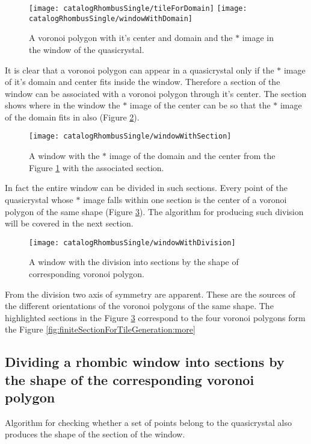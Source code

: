 \documentclass[text.tex]{subfiles}
\begin{document}
\begin{figure}[h]
\centering
\texttt{[image: catalogRhombusSingle/tileForDomain]}
\texttt{[image: catalogRhombusSingle/windowWithDomain]}
\caption{A voronoi polygon with it's center and domain and the $\ast$ image in the window of the quasicrystal.}
\label{fig:windowWithDomain}
\end{figure}

It is clear that a voronoi polygon can appear in a quasicrystal only if the $\ast$ image of it's domain and center fits inside the window. Therefore a section of the window can be associated with a voronoi polygon through it's center. The section shows where in the window the $\ast$ image of the center can be so that the $\ast$ image of the domain fits in also (Figure \ref{fig:windowWithSection}). 

\begin{figure}[h]
\centering
\texttt{[image: catalogRhombusSingle/windowWithSection]}
\caption{A window with the $\ast$ image of the domain and the center from the Figure \ref{fig:windowWithDomain} with the associated section.}
\label{fig:windowWithSection}
\end{figure}

In fact the entire window can be divided in such sections. Every point of the quasicrystal whose $\ast$ image falls within one section is the center of a voronoi polygon of the same shape (Figure \ref{fig:windowWithDivision}). The algorithm for producing such division will be covered in the next section.  

\begin{figure}[h]
\centering
\texttt{[image: catalogRhombusSingle/windowWithDivision]}
\caption{A window with the division into sections by the shape of corresponding voronoi polygon.}
\label{fig:windowWithDivision}
\end{figure}

From the division two axis of symmetry are apparent. These are the sources of the different orientations of the voronoi polygons of the same shape. The highlighted sections in the Figure \ref{fig:windowWithDivision} correspond to the four voronoi polygons form the Figure \ref{fig:finiteSectionForTileGeneration:more}

\subsection{Dividing a rhombic window into sections by the shape of the corresponding voronoi polygon}
Algorithm for checking whether a set of points belong to the quasicrystal also produces the shape of the section of the window. 
\end{document}
